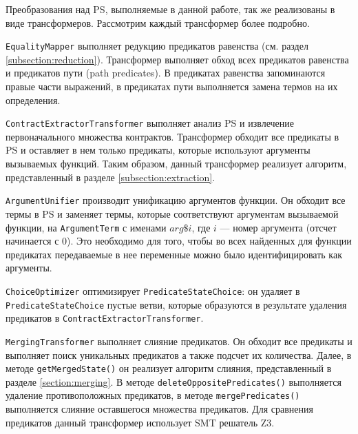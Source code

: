 Преобразования над PS, выполняемые в данной работе, так же реализованы в виде трансформеров. Рассмотрим каждый трансформер более подробно.

\texttt{EqualityMapper} выполняет редукцию предикатов равенства (см. раздел \ref{subsection:reduction}). Трансформер выполняет обход всех предикатов равенства и предикатов пути (path predicates). В предикатах равенства запоминаются правые части выражений, в предикатах пути выполняется замена термов на их определения.

\texttt{ContractExtractorTransformer} выполняет анализ PS и извлечение первоначального множества контрактов. Трансформер обходит все предикаты в PS и оставляет в нем только предикаты, которые используют аргументы вызываемых функций. Таким образом, данный трансформер реализует алгоритм, представленный в разделе \ref{subsection:extraction}.

\texttt{ArgumentUnifier} производит унификацию аргументов функции. Он обходит все термы в PS и заменяет термы, которые соответствуют аргументам вызываемой функции, на \texttt{ArgumentTerm} с именами $arg\$i$, где $i$ --- номер аргумента (отсчет начинается с 0). Это необходимо для того, чтобы во всех найденных для функции предикатах передаваемые в нее переменные можно было идентифицировать как аргументы.

\texttt{ChoiceOptimizer} оптимизирует \texttt{PredicateStateChoice}: он удаляет в \texttt{PredicateStateChoice} пустые ветви, которые образуются в результате удаления предикатов в \texttt{ContractExtractorTransformer}.

\texttt{MergingTransformer} выполняет слияние предикатов. Он обходит все предикаты и выполняет поиск уникальных предикатов а также подсчет их количества. Далее, в методе \texttt{getMergedState()} он реализует алгоритм слияния, представленный в разделе \ref{section:merging}. В методе \texttt{deleteOppositePredicates()} выполняется удаление противоположных предикатов, в методе \texttt{mergePredicates()} выполняется слияние оставшегося множества предикатов. Для сравнения предикатов данный трансформер использует SMT решатель Z3\cite{z3solver}.

